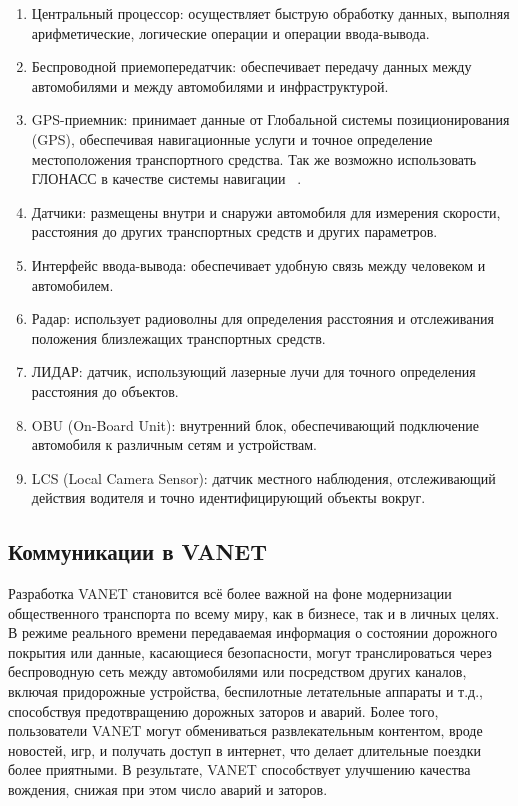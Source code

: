 \begin{enumerate}
    \item Центральный процессор: осуществляет быструю обработку данных, выполняя арифметические, логические операции и операции ввода-вывода.
    \item Беспроводной приемопередатчик: обеспечивает передачу данных между автомобилями и между автомобилями и инфраструктурой.
    \item GPS-приемник: принимает данные от Глобальной системы позиционирования (GPS), обеспечивая навигационные услуги и точное определение местоположения транспортного средства. Так же возможно использовать ГЛОНАСС в качестве системы навигации ~\cite{savelyev2018vanet}. 
    \item Датчики: размещены внутри и снаружи автомобиля для измерения скорости, расстояния до других транспортных средств и других параметров.
    \item Интерфейс ввода-вывода: обеспечивает удобную связь между человеком и автомобилем.
    \item Радар: использует радиоволны для определения расстояния и отслеживания положения близлежащих транспортных средств.
    \item ЛИДАР: датчик, использующий лазерные лучи для точного определения расстояния до объектов.
    \item OBU (On-Board Unit): внутренний блок, обеспечивающий подключение автомобиля к различным сетям и устройствам. ~\cite{truong2015software}
    \item LCS (Local Camera Sensor): датчик местного наблюдения, отслеживающий действия водителя и точно идентифицирующий объекты вокруг.
\end{enumerate}

\newpage

\subsection*{Коммуникации в VANET}

Разработка VANET становится всё более важной на фоне модернизации общественного транспорта по всему миру, как в бизнесе, так и в личных целях. В режиме реального времени передаваемая информация о состоянии дорожного покрытия или данные, касающиеся безопасности, могут транслироваться через беспроводную сеть между автомобилями или посредством других каналов, включая придорожные устройства, беспилотные летательные аппараты и т.д., способствуя предотвращению дорожных заторов и аварий. Более того, пользователи VANET могут обмениваться развлекательным контентом, вроде новостей, игр, и получать доступ в интернет, что делает длительные поездки более приятными. В результате, VANET способствует улучшению качества вождения, снижая при этом число аварий и заторов.

